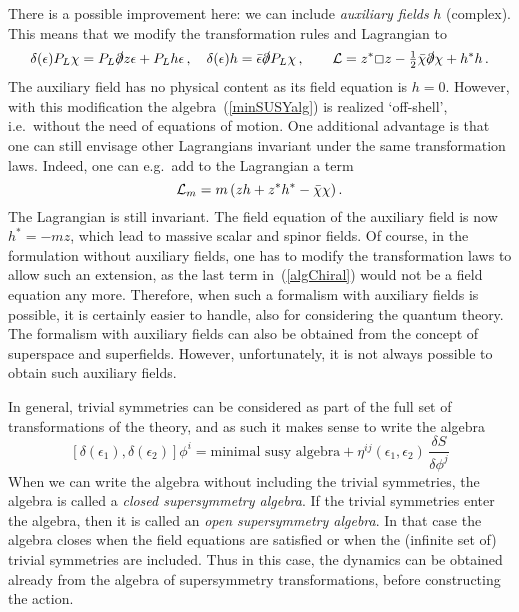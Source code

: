 \documentclass[a4paper,11pt,twoside]{article}
\newcommand{\Red}[1]{#1}
\newcommand{\OliveGreen}[1]{#1}
\newcommand{\Blue}[1]{#1}
\newcommand{\ft}[2]{{\textstyle\frac{#1}{#2}}}
\newcommand{\bbox}{\lower.2ex\hbox{$\Box$}}
\begin{document}
There is a possible improvement here: we can include \emph{auxiliary
fields} $\Red{h}$ (complex). This means that we modify the transformation
rules and Lagrangian to
\begin{equation}
   \delta(\OliveGreen{\epsilon })P_L\Blue{\chi }  =  P_L\slashed \partial\Blue{z}
\OliveGreen{\epsilon} +P_L\Red{h}\OliveGreen{\epsilon } \,, \quad
  \delta(\OliveGreen{\epsilon })\Red{h}  =  \OliveGreen{\bar \epsilon }
\slashed \partial P_L\Blue{\chi}\,, \qquad {\cal L}=\Blue{z^*}\bbox
\Blue{z}-\ft12\Blue{\bar \chi }\slashed\partial \Blue{\chi
}+\Red{h^*}\Red{h}\,.
 \label{withAuxF}
\end{equation}
The auxiliary field has no physical content as its field equation is
$\Red{h}=0$. However, with this modification the
algebra~(\ref{minSUSYalg}) is realized `off-shell', i.e.\ without the
need of equations of motion. One additional advantage is that one can
still envisage other Lagrangians invariant under the same transformation
laws. Indeed, one can e.g.\ add to the Lagrangian a term
\begin{equation}
  {\cal L}_m=m\left( \Blue{z}\Red{h}+\Blue{z^*}\Red{h^*}-\Blue{\bar \chi \chi
  }\right).
 \label{Lchiralm}
\end{equation}
The Lagrangian is still invariant. The field equation of the auxiliary
field is now $\Red{h^*}=-m\Blue{z}$, which lead to massive scalar and
spinor fields. Of course, in the formulation without auxiliary fields,
one has to modify the transformation laws to allow such an extension, as
the last term in~(\ref{algChiral}) would not be a field equation any
more. Therefore, when such a formalism with auxiliary fields is possible,
it is certainly easier to handle, also for considering the quantum
theory. The formalism with auxiliary fields can also be obtained from the
concept of superspace and superfields. However, unfortunately, it is not
always possible to obtain such auxiliary fields.

In general, trivial symmetries can be considered as part of the full set
of transformations of the theory, and as such it makes sense to write the
algebra
\begin{equation}
  \left[ \delta (\OliveGreen{\epsilon _1}),\delta (\OliveGreen{\epsilon _2})\right] \Blue{\phi^i}
=\mbox{minimal susy algebra}+\Red{\eta ^{ij}}(\OliveGreen{\epsilon
_1,\epsilon _2})\,\frac{\delta S}{\delta \Blue{\phi ^j}}
 \label{algWithTriv}
\end{equation}
When we can write the algebra without including the trivial symmetries,
the algebra is called a \emph{closed supersymmetry algebra}. If the
trivial symmetries enter the algebra, then it is called an \emph{open
supersymmetry algebra}. In that case the algebra closes when the field
equations are satisfied or when the (infinite set of) trivial symmetries
are included. Thus in this case, the dynamics can be obtained already
from the algebra of supersymmetry transformations, before constructing
the action.
\end{document}
